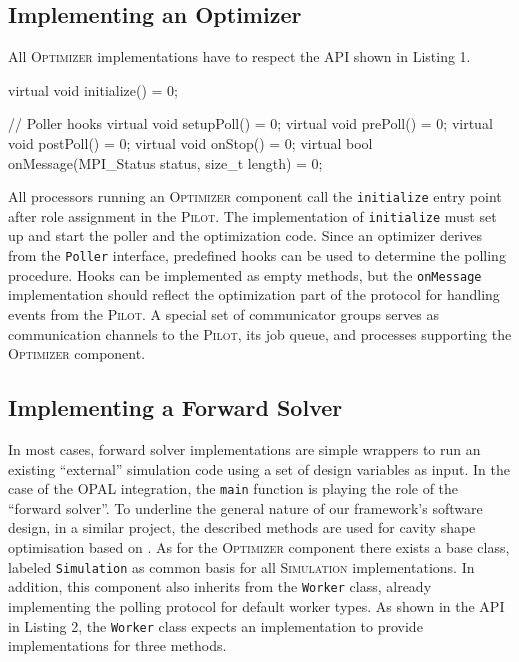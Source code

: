 \documentclass[preprint,linenumbers,amsmath,amssymb,aps,prstab]{revtex4-1}%
\begin{document}
\subsection{Implementing an Optimizer}

All \textsc{Optimizer} implementations have to respect the API shown in
Listing 1.

\begin{code}
virtual void initialize() = 0;

// Poller hooks
virtual void setupPoll() = 0;
virtual void prePoll() = 0;
virtual void postPoll() = 0;
virtual void onStop() = 0;
virtual bool onMessage(MPI_Status status,
                       size_t length) = 0;
\end{code}

All processors running an \textsc{Optimizer} component call the
  \texttt{initialize} entry point after role assignment in the
  \textsc{Pilot}.
The implementation of \texttt{initialize} must set up and start the poller and
  the optimization code.
Since an optimizer derives from the \texttt{Poller} interface, predefined
  hooks can be used to determine the polling procedure.
Hooks can be implemented as empty methods, but the \texttt{onMessage}
  implementation should reflect the optimization part of the protocol for
  handling events from the \textsc{Pilot}.
A special set of communicator groups serves as communication channels to the
  \textsc{Pilot}, its job queue, and processes supporting the
  \textsc{Optimizer} component.


\subsection{Implementing a Forward Solver}

In most cases, forward solver implementations are simple wrappers to run
  an existing ``external'' simulation code using a set of design variables as
  input. In the case of the OPAL integration, the \texttt{main} function is
  playing the role of the ``forward solver''. To underline the general nature of our framework's software design, 
  in a similar project, the described methods are used for cavity shape optimisation based on \cite{ARBENZ2008381}. 
As for the \textsc{Optimizer} component there exists a base class, labeled
  \texttt{Simulation} as common basis for all \textsc{Simulation}
  implementations.
In addition, this component also inherits from the \texttt{Worker} class,
  already implementing the polling protocol for default worker types.
As shown in the API in Listing 2, the \texttt{Worker} class expects an
  implementation to provide implementations for three methods.
\end{document}
